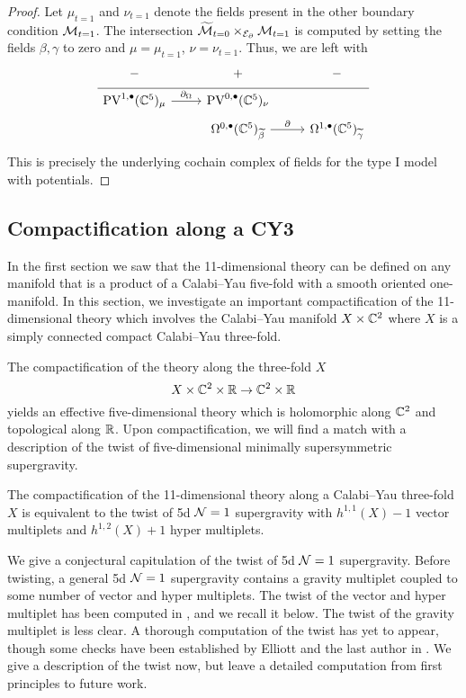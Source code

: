 \begin{proof}
Let $\mu_{t=1}$ and $\nu_{t=1}$ denote the fields present in the other boundary condition $\mathcal M_{t=1}$. 
The intersection $\widetilde {\mathcal M}_{t=0} \times_{\mathcal E_{\partial}} \mathcal M_{t=1}$ is computed by setting the fields $\beta, \gamma$ to zero and $\mu=\mu_{t=1}$, $\nu = \nu_{t=1}$. 
Thus, we are left with
\begin{equation}
  \label{eq:lin3} 
  \begin{tikzcd}[row sep = 1 ex]
    - & + & -\\ \hline
    \PV^{1,\bu}(\CC^5)_\mu \ar[r, "\div"] & \PV^{0,\bu}(\CC^5)_\nu  \\
         & \Omega^{0,\bu}(\CC^5)_{\til\beta} \ar[r, "\del"] & \Omega^{1,\bu}(\CC^5)_{\til\gamma} 
\end{tikzcd}
\end{equation}
This is precisely the underlying cochain complex of fields for the type I model with potentials. 
\end{proof}

\subsection{Compactification along a CY3} 

In the first section we saw that the 11-dimensional theory can be defined on any manifold that is a product of a Calabi--Yau five-fold with a smooth oriented one-manifold. 
In this section, we investigate an important compactification of the 11-dimensional theory which involves the Calabi--Yau manifold $X \times \mathbb C^2$ where $X$ is a simply connected compact Calabi--Yau three-fold.

The compactification of the theory along the three-fold $X$ 
\[
X \times \mathbb C^2 \times \mathbb R \to \mathbb C^2 \times \mathbb R
\]
yields an effective five-dimensional theory which is holomorphic along $\mathbb C^2$ and topological along $\mathbb R$. 
Upon compactification, we will find a match with a description of the twist of five-dimensional minimally supersymmetric supergravity. 

\begin{prop}
\label{prop:5dsugra}
The compactification of the 11-dimensional theory along a Calabi--Yau three-fold $X$ is equivalent to the twist of 5d $\mathcal N=1$ supergravity with $h^{1,1}(X)-1$ vector multiplets and $h^{1,2}(X) + 1$ hyper multiplets. 
\end{prop}

\parsec[s:5dsugra]

We give a conjectural capitulation of the twist of 5d $\mathcal N=1$ supergravity. 
Before twisting, a general 5d $\mathcal N=1$ supergravity contains a gravity multiplet coupled to some number of vector and hyper multiplets. 
The twist of the vector and hyper multiplet has been computed in \cite{ESW}, and we recall it below. 
The twist of the gravity multiplet is less clear. 
A thorough computation of the twist has yet to appear, though some checks have been established by Elliott and the last author in \cite{EWpois}. 
We give a description of the twist now, but leave a detailed computation from first principles to future work. 

